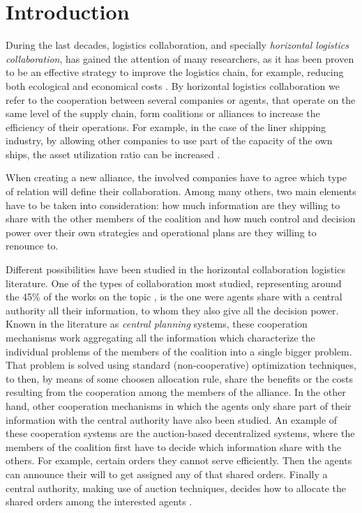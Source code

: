 \documentclass{article}
\begin{document}
\section{Introduction}

During the last decades, logistics collaboration, and specially \emph{horizontal
logistics collaboration}, has gained the attention of many researchers, as it has been proven to be an effective strategy to improve the logistics chain, for example, reducing both ecological and economical costs \parencite{BALLOT2010,SOYSAL2018168}. By horizontal logistics collaboration we refer to the cooperation between several companies or agents, that operate on the same level of the supply chain, form coalitions or alliances to increase the efficiency of their operations. For example, in the case of the liner shipping industry, by allowing other companies to use part of the capacity of the own ships, the asset utilization ratio can be increased \parencite{AGARWAL2008175}.

When creating a new alliance, the involved companies have to agree which type of relation will define their collaboration. Among many others, two main elements have to be taken into consideration: how much information are they willing to share with the other members of the coalition and how much control and decision power over their own strategies and operational plans are they willing to renounce to.

Different possibilities have been studied in the horizontal collaboration logistics literature. One of the types of collaboration most studied, representing around the 45\% of the works on the topic \parencite{GANSTERER2017}, is the one were agents share with a central authority all their information, to whom they also give all the decision power. Known in the literature as \emph{central planning} systems, these cooperation mechanisms work aggregating all the information which characterize the individual problems of the members of the coalition into a single bigger problem. That problem is solved using standard (non-cooperative) optimization techniques, to then, by means of some choosen allocation rule, share the benefits or the costs resulting from the cooperation among the members of the alliance. In the other hand, other cooperation mechanisms in which the agents only share part of their information with the central authority have also been studied. An example of these cooperation systems are the auction-based decentralized systems, where the members of the coalition first have to decide which information share with the others. For example, certain orders they cannot serve efficiently. Then the agents can announce their will to get assigned any of that shared orders. Finally a central authority, making use of auction techniques, decides how to allocate the shared orders among the interested agents \parencite{VERDONCK2013}. 
\end{document}
